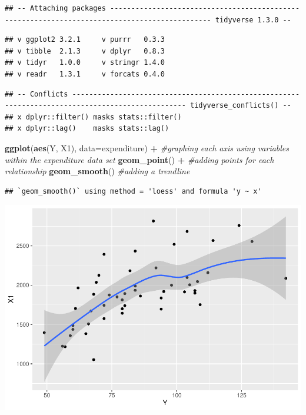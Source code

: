 \documentclass[]{article}
\newenvironment{Shaded}{\begin{snugshade}}{\end{snugshade}}
\newcommand{\CommentTok}[1]{\textcolor[rgb]{0.56,0.35,0.01}{\textit{#1}}}
\newcommand{\DataTypeTok}[1]{\textcolor[rgb]{0.13,0.29,0.53}{#1}}
\newcommand{\KeywordTok}[1]{\textcolor[rgb]{0.13,0.29,0.53}{\textbf{#1}}}
\newcommand{\NormalTok}[1]{#1}
\newcommand{\OperatorTok}[1]{\textcolor[rgb]{0.81,0.36,0.00}{\textbf{#1}}}
\newcommand{\StringTok}[1]{\textcolor[rgb]{0.31,0.60,0.02}{#1}}
\begin{document}
\begin{verbatim}
## -- Attaching packages ---------------------------------------------------------------------------------------------- tidyverse 1.3.0 --
\end{verbatim}

\begin{verbatim}
## v ggplot2 3.2.1     v purrr   0.3.3
## v tibble  2.1.3     v dplyr   0.8.3
## v tidyr   1.0.0     v stringr 1.4.0
## v readr   1.3.1     v forcats 0.4.0
\end{verbatim}

\begin{verbatim}
## -- Conflicts ------------------------------------------------------------------------------------------------- tidyverse_conflicts() --
## x dplyr::filter() masks stats::filter()
## x dplyr::lag()    masks stats::lag()
\end{verbatim}

\begin{Shaded}
\begin{Highlighting}[]
\KeywordTok{ggplot}\NormalTok{(}\KeywordTok{aes}\NormalTok{(Y, X1), }\DataTypeTok{data=}\NormalTok{expenditure) }\OperatorTok{+}\StringTok{ }\CommentTok{#graphing each axis using variables within the expenditure data set}
\StringTok{  }\KeywordTok{geom_point}\NormalTok{() }\OperatorTok{+}\StringTok{ }\CommentTok{#adding points for each relationship}
\StringTok{  }\KeywordTok{geom_smooth}\NormalTok{() }\CommentTok{#adding a trendline}
\end{Highlighting}
\end{Shaded}

\begin{verbatim}
## `geom_smooth()` using method = 'loess' and formula 'y ~ x'
\end{verbatim}

\includegraphics{PS_answers_files/figure-latex/unnamed-chunk-6-1.pdf}
\end{document}
